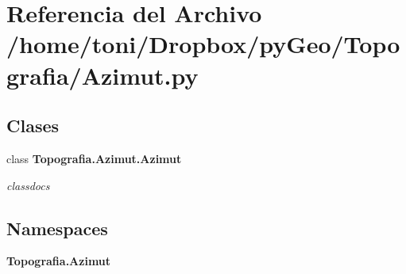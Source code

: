 \section{Referencia del Archivo /home/toni/\-Dropbox/py\-Geo/\-Topografia/\-Azimut.py}
\label{Azimut_8py}
\subsection*{Clases}
\begin{DoxyCompactItemize}
\item 
class {\bf Topografia.\-Azimut.\-Azimut}
\begin{DoxyCompactList}\small\item\em classdocs \end{DoxyCompactList}\end{DoxyCompactItemize}
\subsection*{Namespaces}
\begin{DoxyCompactItemize}
\item 
{\bf Topografia.\-Azimut}
\end{DoxyCompactItemize}

